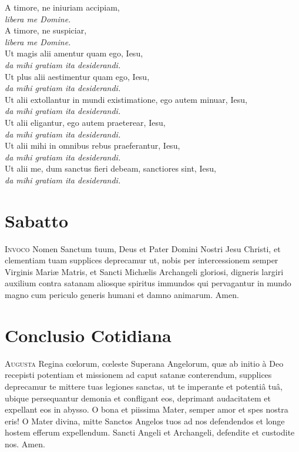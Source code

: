 \documentclass[9pt, twoside]{book}
\begin{document}
{A timore, ne iniuriam accipiam,\\\tab \textit{libera me Domine.}\\
A timore, ne suspiciar,\\\tab \textit{libera me Domine.}\\
Ut magis alii amentur quam ego, Iesu,\\\tab \textit{da mihi gratiam ita desiderandi.}\\
\pagebreak
Ut plus alii aestimentur quam ego, Iesu,\\\tab \textit{da mihi gratiam ita desiderandi.}\\
Ut alii extollantur in mundi existimatione, ego autem minuar, Iesu,\\\tab \textit{da mihi gratiam ita desiderandi.}\\
Ut alii eligantur, ego autem praeterear, Iesu,\\\tab \textit{da mihi gratiam ita desiderandi.}\\
Ut alii mihi in omnibus rebus praeferantur, Iesu,\\\tab \textit{da mihi gratiam ita desiderandi.}\\
Ut alii me, dum sanctus fieri debeam, sanctiores sint, Iesu,\\\tab \textit{da mihi gratiam ita desiderandi.}\\
}

\section{Sabatto}
\lettrine{I}{nvoco} Nomen Sanctum tuum, Deus et Pater Domini Nostri Jesu Christi, et
clementiam tuam supplices deprecamur ut, nobis per intercessionem semper
Virginis Mariæ Matris, et Sancti Michælis Archangeli gloriosi, digneris
largiri auxilium contra satanam aliosque spiritus immundos qui pervagantur
in mundo magno cum periculo generis humani et damno animarum. Amen. 

\section{Conclusio Cotidiana}

\newcommand{\Kern}[2]{\addfontfeature{LetterSpace=#1}#2\addfontfeature{LetterSpace=0}\null}

\lettrine{A}{ugusta} Regina cœlorum, cœleste Superana Angelorum, quæ ab initio à Deo
recepisti potentiam et missionem ad caput satanæ conterendum, supplices
deprecamur te mittere tuas legiones sanctas, ut te imperante et potentiâ tuâ,
ubique persequantur demonia et confligant eos, deprimant audacitatem et
expellant eos in abysso. O bona et piissima Mater, semper amor et spes nostra
eris! O Mater divina, mitte Sanctos Angelos tuos ad nos defendendos et longe
hostem efferum expellendum. Sancti Angeli et Archangeli, defendite et
custodite nos. Amen.
\end{document}
